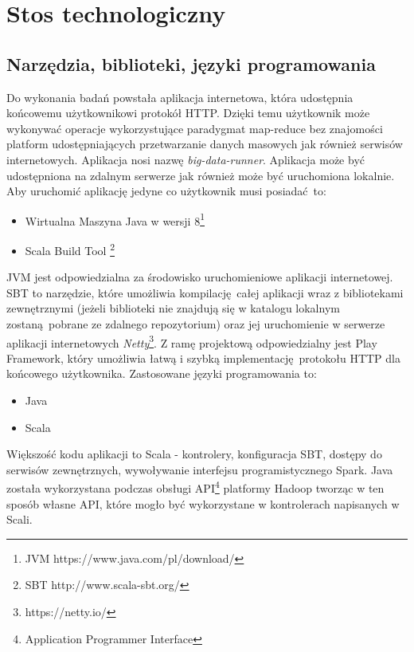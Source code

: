 \chapter{Stos technologiczny} \label{chap.technology-stack}

\section{Narzędzia, biblioteki, języki programowania}
Do wykonania badań powstała aplikacja internetowa, która udostępnia końcowemu użytkownikowi protokół HTTP. Dzięki temu użytkownik może wykonywać operacje wykorzystujące paradygmat map-reduce bez znajomości platform udostępniających przetwarzanie danych masowych jak również serwisów internetowych. Aplikacja nosi nazwę \textit{big-data-runner}. Aplikacja może być udostępniona na zdalnym serwerze jak również może być uruchomiona lokalnie. Aby uruchomić aplikację jedyne co użytkownik musi posiadać to:
\begin{itemize}
	\item{Wirtualna Maszyna Java w wersji 8\footnote{JVM https://www.java.com/pl/download/}}
	\item{Scala Build Tool \footnote{SBT http://www.scala-sbt.org/}}
\end{itemize}
JVM jest odpowiedzialna za środowisko uruchomieniowe aplikacji internetowej. SBT to narzędzie, które umożliwia kompilację całej aplikacji wraz z bibliotekami zewnętrznymi (jeżeli biblioteki nie znajdują się w katalogu lokalnym zostaną pobrane ze zdalnego repozytorium) oraz jej uruchomienie w serwerze aplikacji internetowych \textit{Netty}\footnote{https://netty.io/}. Z ramę projektową odpowiedzialny jest Play Framework, który umożliwia łatwą i szybką implementację protokołu HTTP dla końcowego użytkownika.
\newpage
Zastosowane języki programowania to:
\begin{itemize}
	\item {Java}
	\item {Scala}
\end{itemize}

Większość kodu aplikacji to Scala - kontrolery, konfiguracja SBT, dostępy do serwisów zewnętrznych, wywoływanie interfejsu programistycznego Spark. Java została wykorzystana podczas obsługi API\footnote{Application Programmer Interface} platformy Hadoop tworząc w ten sposób własne API, które mogło być wykorzystane w kontrolerach napisanych w Scali.

